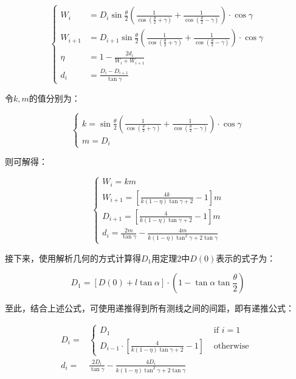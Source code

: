 \begin{equation}
    \begin{cases}
        W_i & = D_i\sin\frac{\theta}{2}\left(\frac{1}{\cos(\frac{\theta}{2}+\gamma)} + \frac{1}{\cos(\frac{\theta}{2}-\gamma)}\right) \cdot \cos \gamma\\
        W_{i + 1} & = D_{i + 1}\sin\frac{\theta}{2}\left(\frac{1}{\cos(\frac{\theta}{2}+\gamma)} + \frac{1}{\cos(\frac{\theta}{2}-\gamma)}\right) \cdot \cos \gamma\\
        \eta & = 1 - \frac{2d_i}{W_i + W_{i + 1}}\\
        d_i & = \frac{D_i - D_{i + 1}}{\tan \gamma}
    \end{cases}
\end{equation}

令$k, m$的值分别为：

\begin{equation}
    \begin{cases}
        k = 
        \sin\frac{\theta}{2}\left(
            \frac{1}{\cos(\frac{\theta}{2}+\gamma)} + 
            \frac{1}{\cos(\frac{\theta}{2}-\gamma)}
        \right) \cdot \cos \gamma\\
        m = D_i
    \end{cases}
\end{equation}

则可解得：

\begin{equation}
    \begin{cases}
        W_i = km\\
        W_{i + 1} = \left[\frac{4k}{k(1 - \eta) \tan \gamma + 2} - 1\right]m\\
        D_{i + 1} = \left[\frac{4}{k(1 - \eta) \tan \gamma + 2} - 1\right]m\\
        d_i = \frac{2m}{\tan \gamma} - \frac{4m}{k(1-\eta) \tan^2 \gamma + 2 \tan \gamma}
    \end{cases}
\end{equation}

接下来，使用解析几何的方式计算得$D_1$用定理2中$D(0)$表示的式子为：

\begin{equation}
    D_1 = \left[ D(0) + l \tan \alpha \right] \cdot \left( 1 - \tan \alpha \tan \frac{\theta}{2} \right)
\end{equation}

至此，结合上述公式，可使用递推得到所有测线之间的间距，即有递推公式：

\begin{align}
    D_{i} = & \begin{cases}
        D_1 & \text{ if } i = 1 \\
        D_{i - 1} \cdot \left[\frac{4}{k(1 - \eta) \tan \gamma + 2} - 1\right] & \text{ otherwise }
    \end{cases}\\
    d_i = & \frac{2D_i}{\tan \gamma} - \frac{4D_i}{k(1-\eta) \tan^2 \gamma + 2 \tan \gamma}
\end{align}

